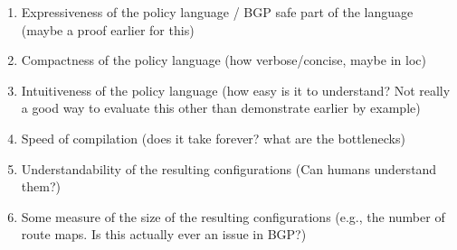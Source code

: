 \begin{enumerate}
	\item Expressiveness of the policy language / BGP safe part of the language (maybe a proof earlier for this)
	\item Compactness of the policy language (how verbose/concise, maybe in loc)
	\item Intuitiveness of the policy language (how easy is it to understand? Not really a good way to evaluate this other than demonstrate earlier by example)
	\item Speed of compilation (does it take forever? what are the bottlenecks)
	\item Understandability of the resulting configurations (Can humans understand them?)
	\item Some measure of the size of the resulting configurations (e.g., the number of route maps. Is this actually ever an issue in BGP?)
\end{enumerate}


